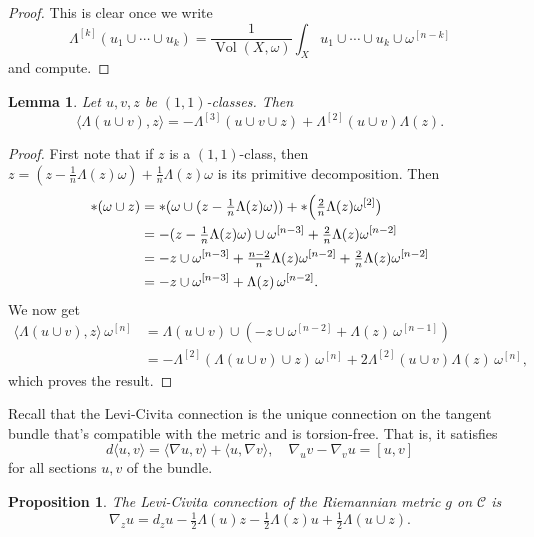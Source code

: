 \documentclass[11pt,a4paper]{amsart}
\newtheorem{prop}[theo]{Proposition}
\newtheorem{lemm}[theo]{Lemma}
\theoremstyle{definition}
\theoremstyle{remark}
\newcommand{\Vol}{\mathop{\mathrm{Vol}}}
\def\levi{\nabla}
\def\kf{\omega}
\def\Lef{\Lambda}
\def\ton{u}
\def\ttw{v}
\def\tth{z}
\def\^#1{^{[#1]}}
\def\KC{C}
\def\RKC{\mathcal{\KC}}
\begin{document}
\begin{proof}
This is clear once we write
$$
\Lef\^{k}(u_1 \cup \cdots \cup u_k)
= \frac{1}{\Vol(X,\kf)} \int_X u_1 \cup \cdots \cup u_k \cup \kf\^{n-k}
$$
and compute.
\end{proof}

\begin{lemm}
\label{lemm:triple}
Let $\ton,\ttw,\tth$ be $(1,1)$-classes. Then
$$
\langle \Lef(\ton\cup\ttw), \tth \rangle
= - \Lef\^3(\ton \cup \ttw \cup \tth)
+ \Lef\^2(\ton \cup \ttw) \Lef(\tth).
$$
\end{lemm}


\begin{proof}
First note that if $\tth$ is a $(1,1)$-class, then $\tth = (\tth -
\frac1n \Lef(\tth)\kf) + \frac1n \Lef(\tth) \kf$ is its primitive
decomposition. Then
\begin{align*}
*(\kf \cup \tth)
&= *( \kf \cup (\tth - \tfrac1n \Lef(\tth)\kf))
+ * \Bigl( \tfrac{2}{n} \Lef(\tth) \kf\^2 \bigr)
\\
&= -(\tth - \tfrac1n \Lef(\tth)\kf) \cup \kf\^{n-3}
+ \tfrac{2}{n} \Lef(\tth) \kf\^{n-2}
\\
&= -\tth \cup \kf\^{n-3}
+ \tfrac{n-2}{n} \Lef(\tth) \kf\^{n-2}
+ \tfrac{2}{n} \Lef(\tth) \kf\^{n-2}
\\
&= -\tth \cup \kf\^{n-3}
+ \Lef(\tth)\, \kf\^{n-2}.
\end{align*}
We now get
\begin{align*}
\langle \Lef(\ton \cup \ttw), \tth \rangle \,\kf\^n
&= \Lef(\ton \cup \ttw) \cup 
(-\tth \cup \kf\^{n-2} + \Lef(\tth)\, \kf\^{n-1})
\\
&= - \Lef\^2(\Lef(\ton \cup \ttw) \cup \tth) \,\kf\^{n}
+ 2 \Lef\^2(\ton \cup \ttw) \Lef(\tth) \,\kf\^{n},
\end{align*}
which proves the result.
\end{proof}


Recall that the Levi-Civita connection is the unique connection on the tangent
bundle that's compatible with the metric and is torsion-free. That is, it
satisfies
$$
d \langle\ton, \ttw\rangle 
= \langle\levi \ton, \ttw\rangle + \langle\ton, \levi \ttw\rangle,
\quad
\levi_{\ton}\ttw - \levi_{\ttw}\ton = [\ton,\ttw]
$$
for all sections $\ton, \ttw$ of the bundle.


\begin{prop}
\label{prop:connection}
The Levi-Civita connection of the Riemannian metric $g$ on $\RKC$ is
$$
\levi_{\tth} \ton
=
d_\tth \ton
-\tfrac12 \Lef(\ton) \tth
-\tfrac12 \Lef(\tth) \ton
+\tfrac12 \Lef(\ton \cup \tth).
$$
\end{prop}
\end{document}

